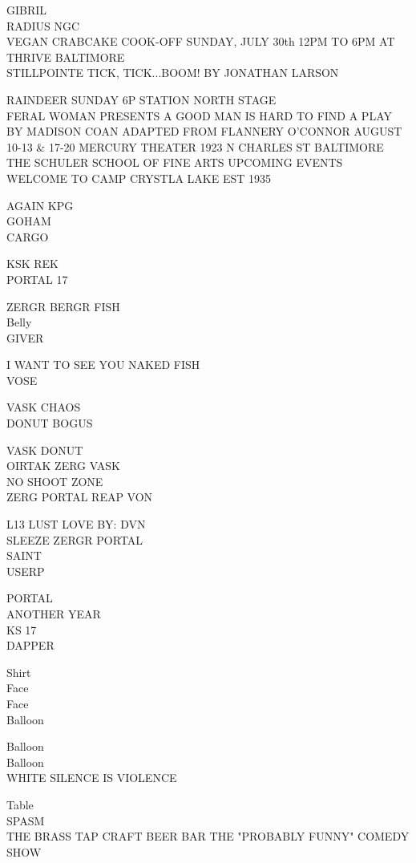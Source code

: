 \documentclass[10pt,letterpaper]{article}
\begin{document}
GIBRIL\\
RADIUS NGC\\
VEGAN CRABCAKE COOK{-}OFF SUNDAY, JULY 30th 12PM TO 6PM AT THRIVE BALTIMORE\\
STILLPOINTE TICK, TICK...BOOM!  BY JONATHAN LARSON

RAINDEER SUNDAY 6P STATION NORTH STAGE\\
FERAL WOMAN PRESENTS A GOOD MAN IS HARD TO FIND A PLAY BY MADISON COAN ADAPTED FROM FLANNERY O'CONNOR AUGUST 10{-}13 \& 17{-}20 MERCURY THEATER 1923 N CHARLES ST BALTIMORE\\
THE SCHULER SCHOOL OF FINE ARTS UPCOMING EVENTS\\
WELCOME TO CAMP CRYSTLA LAKE EST 1935

AGAIN KPG\\
GOHAM\\
CARGO

KSK REK\\
PORTAL 17

ZERGR BERGR FISH\\
Belly\\
GIVER

I WANT TO SEE YOU NAKED FISH\\
VOSE

VASK CHAOS\\
DONUT BOGUS

VASK DONUT\\
OIRTAK ZERG VASK\\
NO SHOOT ZONE\\
ZERG PORTAL REAP VON

L13 LUST LOVE BY: DVN\\
SLEEZE ZERGR PORTAL\\
SAINT\\
USERP

PORTAL\\
ANOTHER YEAR\\
KS 17\\
DAPPER

Shirt\\
Face\\
Face\\
Balloon

Balloon\\
Balloon\\
WHITE SILENCE IS VIOLENCE

Table\\
SPASM\\
THE BRASS TAP CRAFT BEER BAR THE "PROBABLY FUNNY" COMEDY SHOW
\end{document}

